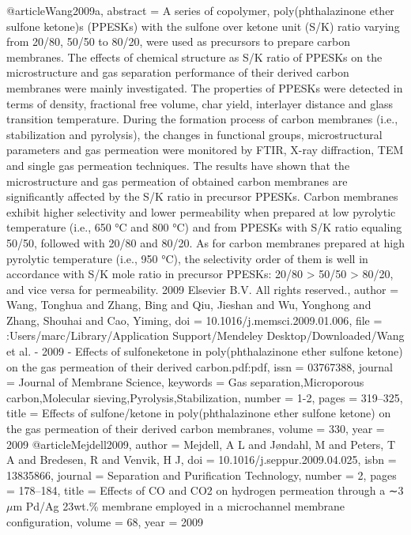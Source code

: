@article{Wang2009a,
abstract = {A series of copolymer, poly(phthalazinone ether sulfone ketone)s (PPESKs) with the sulfone over ketone unit (S/K) ratio varying from 20/80, 50/50 to 80/20, were used as precursors to prepare carbon membranes. The effects of chemical structure as S/K ratio of PPESKs on the microstructure and gas separation performance of their derived carbon membranes were mainly investigated. The properties of PPESKs were detected in terms of density, fractional free volume, char yield, interlayer distance and glass transition temperature. During the formation process of carbon membranes (i.e., stabilization and pyrolysis), the changes in functional groups, microstructural parameters and gas permeation were monitored by FTIR, X-ray diffraction, TEM and single gas permeation techniques. The results have shown that the microstructure and gas permeation of obtained carbon membranes are significantly affected by the S/K ratio in precursor PPESKs. Carbon membranes exhibit higher selectivity and lower permeability when prepared at low pyrolytic temperature (i.e., 650 °C and 800 °C) and from PPESKs with S/K ratio equaling 50/50, followed with 20/80 and 80/20. As for carbon membranes prepared at high pyrolytic temperature (i.e., 950 °C), the selectivity order of them is well in accordance with S/K mole ratio in precursor PPESKs: 20/80 {\textgreater} 50/50 {\textgreater} 80/20, and vice versa for permeability. {\textcopyright} 2009 Elsevier B.V. All rights reserved.},
author = {Wang, Tonghua and Zhang, Bing and Qiu, Jieshan and Wu, Yonghong and Zhang, Shouhai and Cao, Yiming},
doi = {10.1016/j.memsci.2009.01.006},
file = {:Users/marc/Library/Application Support/Mendeley Desktop/Downloaded/Wang et al. - 2009 - Effects of sulfoneketone in poly(phthalazinone ether sulfone ketone) on the gas permeation of their derived carbon.pdf:pdf},
issn = {03767388},
journal = {Journal of Membrane Science},
keywords = {Gas separation,Microporous carbon,Molecular sieving,Pyrolysis,Stabilization},
number = {1-2},
pages = {319--325},
title = {{Effects of sulfone/ketone in poly(phthalazinone ether sulfone ketone) on the gas permeation of their derived carbon membranes}},
volume = {330},
year = {2009}
}
@article{Mejdell2009,
author = {Mejdell, A L and J{\o}ndahl, M and Peters, T A and Bredesen, R and Venvik, H J},
doi = {10.1016/j.seppur.2009.04.025},
isbn = {13835866},
journal = {Separation and Purification Technology},
number = {2},
pages = {178--184},
title = {{Effects of CO and CO2 on hydrogen permeation through a ∼3$\mu$m Pd/Ag 23wt.{\%} membrane employed in a microchannel membrane configuration}},
volume = {68},
year = {2009}
}
